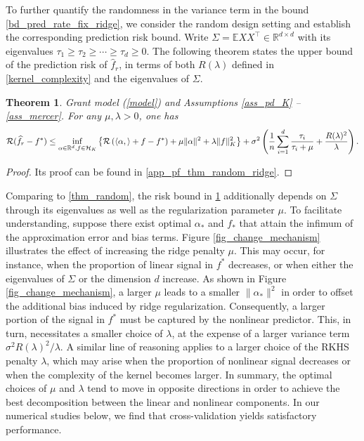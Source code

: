 \documentclass[11pt,twoside]{article}
\newtheorem{theorem}{Theorem}
\def\RR{\mathbb{R}}
\def\EE{\mathbb{E}}
\def\cH{\mathcal H}
\def\cR{\mathcal R}
\def\wh{\widehat}
\def\T{\top}
\def\l{\left}
\def\r{\right}
\begin{document}
To further quantify the randomness in the variance term in the bound \eqref{bd_pred_rate_fix_ridge}, we consider the random design setting and establish the corresponding prediction risk bound.  
Write $\Sigma = \EE XX^\T \in \RR^{d\times d}$ with its eigenvalues  $\tau_1\ge\tau_2\ge \cdots\ge \tau_d\ge 0$. 
The following theorem states the upper bound of the prediction risk of $\wh f_r$, in terms of both $R(\lambda)$ defined in \eqref{kernel_complexity} and the eigenvalues of $\Sigma$. 

\begin{theorem}\label{bd_pred_rate_random_ridge}
Grant model (\ref{model}) and
Assumptions  \ref{ass_pd_K} -- \ref{ass_mercer}. For any  $\mu, \lambda >0$, one has
\begin{align*}
     \cR( \wh  f_r -f^*)  \le    \inf_{\alpha \in \RR^d, f\in \cH_K}\left\{  \cR\l(\langle \alpha,\rangle + f-f^* \r)+\mu\|\alpha\|^2 +  \lambda \|f\|_K^2  \right\} + \sigma^2  \left( {1 \over n}  \sum_{i=1}^d {\tau_i\over \tau_i + \mu}   + \frac{R(\lambda)^2}{\lambda}\right).
\end{align*}
\end{theorem}
\begin{proof}
    Its proof can be found in \cref{app_pf_thm_random_ridge}.
\end{proof}

Comparing to \cref{thm_random}, the risk bound in \cref{bd_pred_rate_random_ridge} additionally depends on  $\Sigma$ through its eigenvalues as well as the regularization parameter $\mu$. 
 To facilitate understanding, suppose there exist optimal $ \alpha_*$ and $f_*$ that attain the infimum of the approximation error and bias terms. Figure \ref{fig_change_mechanism} illustrates the effect of increasing the ridge penalty $\mu$. This may occur, for instance, when the proportion of linear signal in $f^*$ decreases, or when either the eigenvalues of $\Sigma$ or the dimension $d$ increase. As shown in Figure \ref{fig_change_mechanism}, a larger $\mu$ leads to a smaller $\|\alpha_*\|^2$ in order to offset the additional bias induced by ridge regularization. Consequently, a larger portion of the signal in $f^*$ must be captured by the nonlinear predictor. This, in turn, necessitates a smaller choice of $\lambda$, at the expense of a larger variance term $\sigma^2 R(\lambda)^2/\lambda$.
A similar line of reasoning applies to a larger choice of the RKHS penalty $\lambda$, which may arise when the proportion of nonlinear signal decreases or when the complexity of the kernel becomes larger. In summary, the optimal choices of $\mu$ and $\lambda$ tend to move in opposite directions in order to achieve the best decomposition between the linear and nonlinear components. In our numerical studies below, we find that cross-validation yields satisfactory performance.
\end{document}
